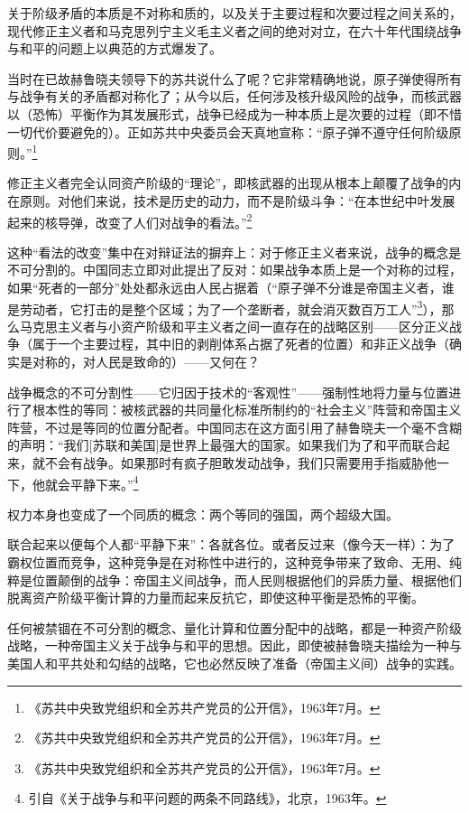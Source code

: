 \documentclass[fontset=fandol, a4paper, 12pt, twoside]{ctexart}
\begin{document}
关于阶级矛盾的本质是不对称和质的，以及关于主要过程和次要过程之间关系的，现代修正主义者和马克思列宁主义毛主义者之间的绝对对立，在六十年代围绕战争与和平的问题上以典范的方式爆发了。

当时在已故赫鲁晓夫领导下的苏共说什么了呢？它非常精确地说，原子弹使得所有与战争有关的矛盾都对称化了；从今以后，任何涉及核升级风险的战争，而核武器以（恐怖）平衡作为其发展形式，战争已经成为一种本质上是次要的过程（即不惜一切代价要避免的）。正如苏共中央委员会天真地宣称：“原子弹不遵守任何阶级原则。”\footnote{《苏共中央致党组织和全苏共产党员的公开信》，1963年7月。}

修正主义者完全认同资产阶级的“理论”，即核武器的出现从根本上颠覆了战争的内在原则。对他们来说，技术是历史的动力，而不是阶级斗争：“在本世纪中叶发展起来的核导弹，改变了人们对战争的看法。”\footnote{《苏共中央致党组织和全苏共产党员的公开信》，1963年7月。}

这种“看法的改变”集中在对辩证法的摒弃上：对于修正主义者来说，战争的概念是不可分割的。中国同志立即对此提出了反对：如果战争本质上是一个对称的过程，如果“死者的一部分”处处都永远由人民占据着（“原子弹不分谁是帝国主义者，谁是劳动者，它打击的是整个区域；为了一个垄断者，就会消灭数百万工人”\footnote{《苏共中央致党组织和全苏共产党员的公开信》，1963年7月。}），那么马克思主义者与小资产阶级和平主义者之间一直存在的战略区别——区分正义战争（属于一个主要过程，其中旧的剥削体系占据了死者的位置）和非正义战争（确实是对称的，对人民是致命的）——又何在？

战争概念的不可分割性——它归因于技术的“客观性”——强制性地将力量与位置进行了根本性的等同：被核武器的共同量化标准所制约的“社会主义”阵营和帝国主义阵营，不过是等同的位置分配者。中国同志在这方面引用了赫鲁晓夫一个毫不含糊的声明：“我们[苏联和美国]是世界上最强大的国家。如果我们为了和平而联合起来，就不会有战争。如果那时有疯子胆敢发动战争，我们只需要用手指威胁他一下，他就会平静下来。”\footnote{引自《关于战争与和平问题的两条不同路线》，北京，1963年。}

权力本身也变成了一个同质的概念：两个等同的强国，两个超级大国。

联合起来以便每个人都“平静下来”：各就各位。或者反过来（像今天一样）：为了霸权位置而竞争，这种竞争是在对称性中进行的，这种竞争带来了致命、无用、纯粹是位置颠倒的战争：帝国主义间战争，而人民则根据他们的异质力量、根据他们脱离资产阶级平衡计算的力量而起来反抗它，即使这种平衡是恐怖的平衡。

任何被禁锢在不可分割的概念、量化计算和位置分配中的战略，都是一种资产阶级战略，一种帝国主义关于战争与和平的思想。因此，即使被赫鲁晓夫描绘为一种与美国人和平共处和勾结的战略，它也必然反映了准备（帝国主义间）战争的实践。
\end{document}
